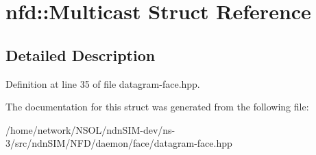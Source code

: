 \hypertarget{structnfd_1_1Multicast}{}\section{nfd\+:\+:Multicast Struct Reference}
\label{structnfd_1_1Multicast}


\subsection{Detailed Description}


Definition at line 35 of file datagram-\/face.\+hpp.



The documentation for this struct was generated from the following file\+:\begin{DoxyCompactItemize}
\item 
/home/network/\+N\+S\+O\+L/ndn\+S\+I\+M-\/dev/ns-\/3/src/ndn\+S\+I\+M/\+N\+F\+D/daemon/face/datagram-\/face.\+hpp\end{DoxyCompactItemize}
